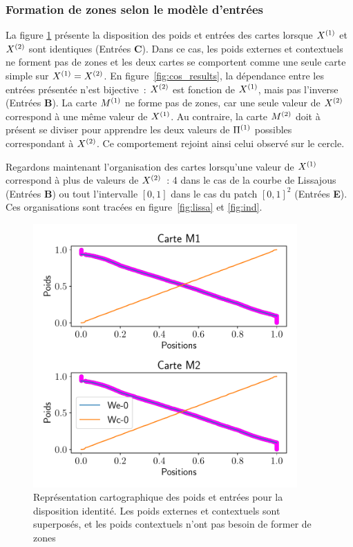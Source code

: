 \documentclass[../main]{subfiles}
\begin{document}
\subsubsection{Formation de zones selon le modèle d'entrées}

La figure \ref{fig:id_results} présente la disposition des poids et entrées des cartes lorsque $X^{({1})}$ et $X^{({2})}$ sont identiques (Entrées \textbf{C}).
Dans ce cas, les poids externes et contextuels ne forment pas de zones et les deux cartes se comportent comme une seule carte simple sur $X^{({1})} = X^{({2})}$. 
En figure~\ref{fig:cos_results}, la dépendance entre les entrées présentée n'est bijective~: $X^{({2})}$ est fonction de $X^{({1})}$, mais pas l'inverse (Entrées \textbf{B}). 
La carte $M^{({1})}$ ne forme pas de zones, car une seule valeur de $X^{({2})}$ correspond à une même valeur de $X^{({1})}$.
Au contraire, la carte $M^{({2})}$ doit à présent se diviser pour apprendre les deux valeurs de $\Pi^{({1})}$ possibles correspondant à $X^{({2})}$. 
Ce comportement rejoint ainsi celui observé sur le cercle.

Regardons maintenant l'organisation des cartes lorsqu'une valeur de $X^{({1})}$ correspond à plus de valeurs de $X^{({2})}$~: 4 dans le cas de la courbe de Lissajous (Entrées \textbf{B}) ou tout l'intervalle $[0,1]$ dans le cas du patch $[0,1]^2$ (Entrées \textbf{E}). Ces organisations sont tracées en figure~\ref{fig:lissa} et \ref{fig:ind}.
\begin{figure}[hb]
	\centering\includegraphics[width=0.9\textwidth]{2som_id_w.pdf}
	\vspace{-0.7cm}
	\caption{Représentation cartographique des poids et entrées pour la disposition identité. Les poids externes et contextuels sont superposés, et les poids contextuels n'ont pas besoin de former de zones \label{fig:id_results}}
\end{figure}
\end{document}
